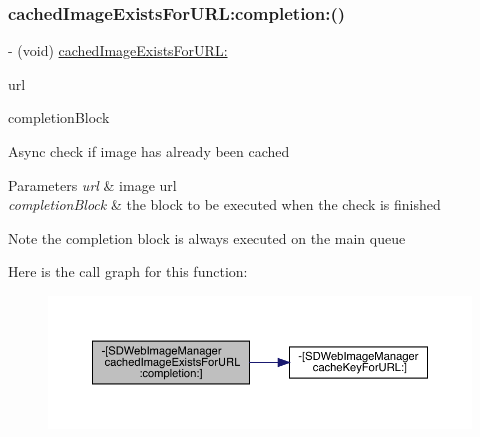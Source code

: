 \subsubsection{\texorpdfstring{cached\+Image\+Exists\+For\+U\+R\+L\+:completion\+:()}{cachedImageExistsForURL:completion:()}\hspace{0.1cm}{\footnotesize\ttfamily [1/3]}}
{\footnotesize\ttfamily -\/ (void) \mbox{\hyperlink{interface_s_d_web_image_manager_a9634c36e65314e0b973056a96f6a62e2}{cached\+Image\+Exists\+For\+U\+R\+L\+:}} \begin{DoxyParamCaption}\item[{(N\+S\+U\+RL $\ast$)}]{url }\item[{completion:(S\+D\+Web\+Image\+Check\+Cache\+Completion\+Block)}]{completion\+Block }\end{DoxyParamCaption}}

Async check if image has already been cached


\begin{DoxyParams}{Parameters}
{\em url} & image url \\
\hline
{\em completion\+Block} & the block to be executed when the check is finished\\
\hline
\end{DoxyParams}
\begin{DoxyNote}{Note}
the completion block is always executed on the main queue 
\end{DoxyNote}
Here is the call graph for this function\+:\nopagebreak
\begin{figure}[H]
\begin{center}
\leavevmode
\includegraphics[width=350pt]{interface_s_d_web_image_manager_a5583bb0fba17b92ce2fe9245b6ecafd2_cgraph}
\end{center}
\end{figure}
\mbox{\label{interface_s_d_web_image_manager_a5583bb0fba17b92ce2fe9245b6ecafd2}} 
